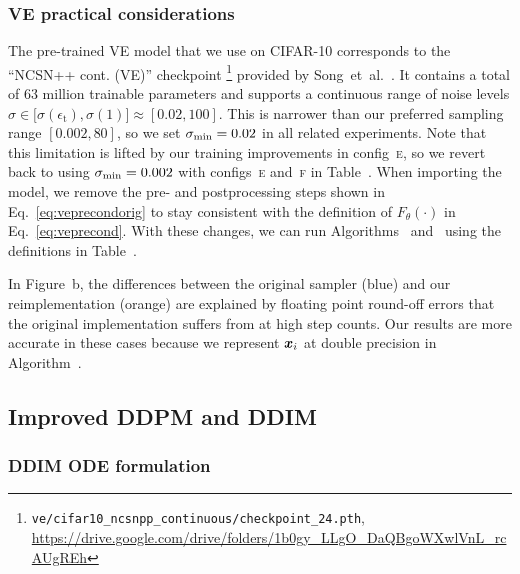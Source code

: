 \subsubsection{VE practical considerations}

The pre-trained VE model that we use on CIFAR-10 corresponds to the ``NCSN++ cont. (VE)'' checkpoint%
\footnote{\tiny\texttt{ve/cifar10\_ncsnpp\_continuous/checkpoint\_24.pth}, \url{https://drive.google.com/drive/folders/1b0gy\_LLgO\_DaQBgoWXwlVnL\_rcAUgREh}}
provided by Song~et~al.~\cite{Song2021sde}.
It contains a total of 63 million trainable parameters and supports a continuous range of noise levels $\sigma \in \big[ \sigma(\epsilon_\text{t}), \sigma(1) \big] \approx [0.02, 100]$.
This is narrower than our preferred sampling range $[0.002, 80]$, so we set $\smin = 0.02$ in all related experiments.
Note that this limitation is lifted by our training improvements in config~\textsc{e}, so we revert back to using $\smin = 0.002$ with configs~\textsc{e} and~\textsc{f} in Table~.
When importing the model, we remove the pre- and postprocessing steps shown in Eq.~\ref{eq:veprecondorig} to stay consistent with the definition of $F_\theta(\cdot)$ in Eq.~\ref{eq:veprecond}.
With these changes, we can run Algorithms~ and~ using the definitions in Table~.

In Figure~b, the differences between the original sampler (blue) and our reimplementation (orange) are explained by floating point round-off errors that the original implementation suffers from at high step counts.
Our results are more accurate in these cases because we represent $\boldsymbol{x}_i$ at double precision in Algorithm~.

\subsection{Improved DDPM and DDIM}
\label{app:reframingiddpm}

\subsubsection{DDIM ODE formulation}
\label{app:ddim}

